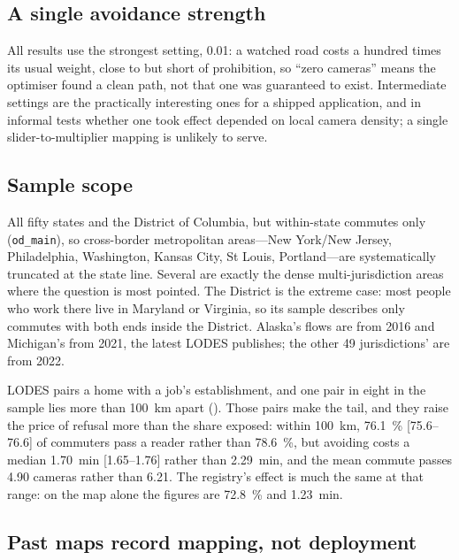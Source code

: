 \documentclass[11pt,twoside]{article}
\begin{document}
\subsection{A single avoidance strength}

All results use the strongest setting, \num{0.01}: a watched road costs a hundred times its
usual weight, close to but short of prohibition, so ``zero cameras'' means the optimiser found
a clean path, not that one was guaranteed to exist. Intermediate settings are the practically
interesting ones for a shipped application, and in informal tests whether one took effect
depended on local camera density; a single slider-to-multiplier mapping is unlikely to serve.

\subsection{Sample scope}
\label{sec:lim:scope}

All fifty states and the District of Columbia, but within-state commutes only
(\texttt{od\_main}), so cross-border metropolitan areas---New York/New Jersey,
Philadelphia, Washington, Kansas City, St Louis, Portland---are systematically truncated at
the state line. Several are exactly the dense multi-jurisdiction areas where the question
is most pointed. The District is the extreme case: most people who work there live in
Maryland or Virginia, so its sample describes only commutes with both ends inside the
District. Alaska's flows are from 2016 and Michigan's from 2021, the latest LODES
publishes; the other 49 jurisdictions' are from 2022.

LODES pairs a home with a job's establishment, and one pair in eight in the sample lies more
than \SI{100}{\kilo\metre} apart (). Those pairs make the tail, and
they raise the price of refusal more than the share exposed: within \SI{100}{\kilo\metre},
\SI{76.1}{\percent} [75.6--76.6] of commuters pass a reader rather than \SI{78.6}{\percent},
but avoiding costs a median \SI{1.70}{\minute} [1.65--1.76] rather than \SI{2.29}{\minute},
and the mean commute passes \num{4.90} cameras rather than \num{6.21}. The registry's effect
is much the same at that range: on the map alone the figures are \SI{72.8}{\percent} and
\SI{1.23}{\minute}.

\subsection{Past maps record mapping, not deployment}
\end{document}
